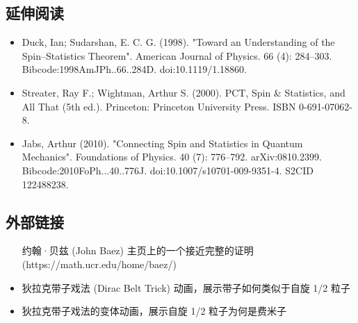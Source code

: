 \subsection{延伸阅读}  
\begin{itemize}
\item Duck, Ian; Sudarshan, E. C. G. (1998). "Toward an Understanding of the Spin–Statistics Theorem". American Journal of Physics. 66 (4): 284–303. Bibcode:1998AmJPh..66..284D. doi:10.1119/1.18860.  
\item Streater, Ray F.; Wightman, Arthur S. (2000). PCT, Spin & Statistics, and All That (5th ed.). Princeton: Princeton University Press. ISBN 0-691-07062-8.  
\item Jabs, Arthur (2010). "Connecting Spin and Statistics in Quantum Mechanics". Foundations of Physics. 40 (7): 776–792. arXiv:0810.2399. Bibcode:2010FoPh...40..776J. doi:10.1007/s10701-009-9351-4. S2CID 122488238. 
\end{itemize} 
\subsection{外部链接} 
\begin{itemize}
\item [约翰·贝兹 (John Baez) 主页上的一个接近完整的证明](https://math.ucr.edu/home/baez/)  
\item 狄拉克带子戏法 (Dirac Belt Trick) 动画，展示带子如何类似于自旋 1/2 粒子  
\item 狄拉克带子戏法的变体动画，展示自旋 1/2 粒子为何是费米子
\end{itemize}